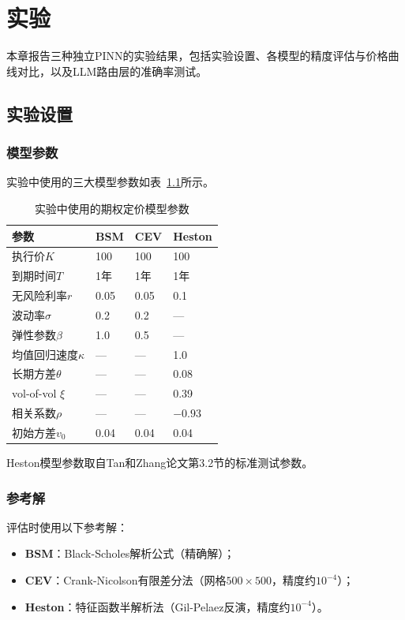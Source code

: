 \chapter{实验}\label{chap:experiment}

本章报告三种独立PINN的实验结果，包括实验设置、各模型的精度评估与价格曲线对比，以及LLM路由层的准确率测试。

\section{实验设置}\label{sec:exp_setup}

\subsection{模型参数}

实验中使用的三大模型参数如表~\ref{tab:model_params}所示。

\begin{table}[htbp]
  \centering
  \caption{实验中使用的期权定价模型参数}
  \label{tab:model_params}
  \begin{tabular}{llll}
    \hline
    参数 & BSM & CEV & Heston \\
    \hline
    执行价$K$ & 100 & 100 & 100 \\
    到期时间$T$ & 1年 & 1年 & 1年 \\
    无风险利率$r$ & 0.05 & 0.05 & 0.1 \\
    波动率$\sigma$ & 0.2 & 0.2 & --- \\
    弹性参数$\beta$ & 1.0 & 0.5 & --- \\
    均值回归速度$\kappa$ & --- & --- & 1.0 \\
    长期方差$\theta$ & --- & --- & 0.08 \\
    vol-of-vol $\xi$ & --- & --- & 0.39 \\
    相关系数$\rho$ & --- & --- & $-0.93$ \\
    初始方差$v_0$ & 0.04 & 0.04 & 0.04 \\
    \hline
  \end{tabular}
\end{table}

Heston模型参数取自Tan和Zhang\citep{guo2024icpinn}论文第3.2节的标准测试参数。

\subsection{参考解}

评估时使用以下参考解：
\begin{itemize}
  \item \textbf{BSM}：Black-Scholes解析公式（精确解）；
  \item \textbf{CEV}：Crank-Nicolson有限差分法（网格$500\times 500$，精度约$10^{-4}$）；
  \item \textbf{Heston}：特征函数半解析法（Gil-Pelaez反演，精度约$10^{-4}$）。
\end{itemize}

